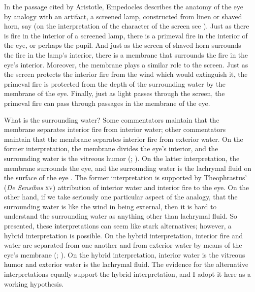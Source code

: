 In the passage cited by Aristotle, Empedocles describes the anatomy of the eye by analogy with an artifact, a screened lamp, constructed from linen or shaved horn, say (on the interpretation of the character of the screen see \citealt[240--241]{Wright:1981zr}). Just as there is fire in the interior of a screened lamp, there is a primeval fire in the interior of the eye, or perhaps the pupil. And just as the screen of shaved horn surrounds the fire in the lamp's interior, there is a membrane that surrounds the fire in the eye's interior. Moreover, the membrane plays a similar role to the screen. Just as the screen protects the interior fire from the wind which would extinguish it, the primeval fire is protected from the depth of the surrounding water by the membrane of the eye. Finally, just as light passes through the screen, the primeval fire can pass through passages in the membrane of the eye. 

What is the surrounding water? Some commentators maintain that the membrane separates interior fire from interior water; other commentators maintain that the membrane separates interior fire from exterior water. On the former interpretation, the membrane divides the eye's interior, and the surrounding water is the vitreous humor (\citealt[16]{Beare:1906uq}; \citealt[241--242]{Wright:1981zr}). On the latter interpretation, the membrane surrounds the eye, and the surrounding water is the lachrymal fluid on the surface of the eye \citep{Sedley:1992uq}. The former interpretation is supported by Theophrastus' (\emph{De Sensibus} \textsc{xv}) attribution of interior water and interior fire to the eye. On the other hand, if we take seriously one particular aspect of the analogy, that the surrounding water is like the wind in being external, then it is hard to understand the surrounding water as anything other than lachrymal fluid. So presented, these interpretations can seem like stark alternatives; however, a hybrid interpretation is possible. On the hybrid interpretation, interior fire and water are separated from one another and from exterior water by means of the eye's membrane (\citealt[326]{Lloyd:1966ly}; \citealt[26 n39]{Ierodiakonou:2005fk}). On the hybrid interpretation, interior water is the vitreous humor and exterior water is the lachrymal fluid. The evidence for the alternative interpretations equally support the hybrid interpretation, and I adopt it here as a working hypothesis.

